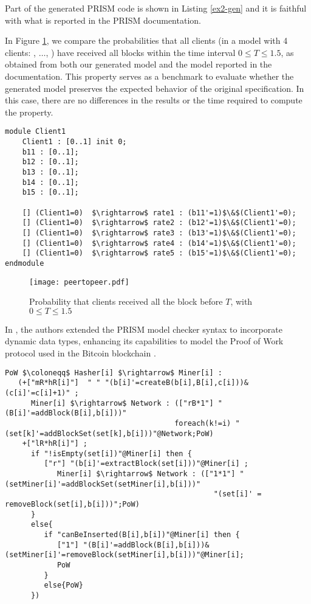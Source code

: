 Part of the generated PRISM code is shown in Listing \ref{ex2-gen} and it is faithful with what is reported in the PRISM documentation. 

In Figure \ref{ex2-res}, we compare the probabilities that all clients (in a model with 4 
clients: , $\ldots$, ) have received all blocks 
within the time interval $0 \leq T \leq 1.5$, as obtained from both our generated model 
and the model reported in the documentation. This property serves as a benchmark to 
evaluate whether the generated model preserves the expected behavior of the original 
specification. In this case, there are no differences in the results or the time required 
to compute the property.
\begin{lstlisting}[style=prism-color,caption={Generated PRISM program for the Peer-To-Peer Protocol},captionpos=b,label={ex2-gen}]
module Client1
	Client1 : [0..1] init 0;
	b11 : [0..1]; 
	b12 : [0..1]; 
	b13 : [0..1]; 
	b14 : [0..1]; 
	b15 : [0..1]; 

	[] (Client1=0)  $\rightarrow$ rate1 : (b11'=1)$\&$(Client1'=0); 
	[] (Client1=0)  $\rightarrow$ rate2 : (b12'=1)$\&$(Client1'=0); 
	[] (Client1=0)  $\rightarrow$ rate3 : (b13'=1)$\&$(Client1'=0); 
	[] (Client1=0)  $\rightarrow$ rate4 : (b14'=1)$\&$(Client1'=0); 
	[] (Client1=0)  $\rightarrow$ rate5 : (b15'=1)$\&$(Client1'=0); 
endmodule
\end{lstlisting}
\begin{figure}[h]
   \centering
   \texttt{[image: peertopeer.pdf]}	
   \caption{Probability that clients received all the block before $T$, with $0\leq T \leq 1.5$}
   \label{ex2-res}
   \end{figure}
   
  

In \cite{DBLP:journals/concurrency/BistarelliNGLMV23}, the authors extended the PRISM model checker syntax to incorporate dynamic data types, enhancing its capabilities to model the Proof of Work protocol used in the Bitcoin blockchain \cite{bitcoin}. 

  \begin{lstlisting}[style=chor-color,breaklines=true, postbreak=\mbox{\textcolor{red}{$\hookrightarrow$}\space},caption={Choreography for the Proof of Work Bitcoin Protocol},captionpos=b,label={ex3-code}]
   PoW $\coloneqq$ Hasher[i] $\rightarrow$ Miner[i] :
   (+["mR*hR[i]"]  " " "(b[i]'=createB(b[i],B[i],c[i]))&(c[i]'=c[i]+1)" ; 
      Miner[i] $\rightarrow$ Network : (["rB*1"] "(B[i]'=addBlock(B[i],b[i]))" 
                                       foreach(k!=i) "(set[k]'=addBlockSet(set[k],b[i]))"@Network;PoW)
    +["lR*hR[i]"] ; 
      if "!isEmpty(set[i])"@Miner[i] then { 
         ["r"] "(b[i]'=extractBlock(set[i]))"@Miner[i] ;  
            Miner[i] $\rightarrow$ Network : (["1*1"] "(setMiner[i]'=addBlockSet(setMiner[i],b[i]))" 
                                                "(set[i]' = removeBlock(set[i],b[i]))";PoW) 
      }
      else{
         if "canBeInserted(B[i],b[i])"@Miner[i] then { 
            ["1"] "(B[i]'=addBlock(B[i],b[i]))&(setMiner[i]'=removeBlock(setMiner[i],b[i]))"@Miner[i];
            PoW 
         }
         else{PoW}
      })
   \end{lstlisting}

